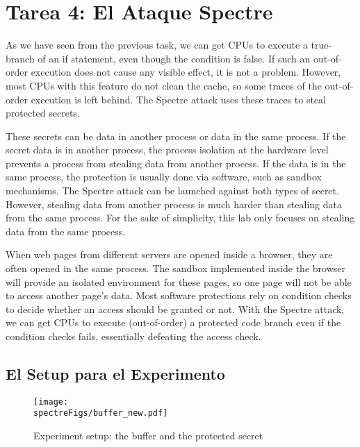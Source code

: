 \section{Tarea 4: El Ataque Spectre}


As we have seen from the previous task, we can get CPUs to execute a true-branch of an
if statement, even though the condition is false. If such an out-of-order execution does not
cause any visible effect, it is not a problem. However, most CPUs with this feature do not
clean the cache, so some traces of the out-of-order execution is left behind. The 
Spectre attack uses these traces to steal protected secrets. 


These secrets can be data in another process or data in the same process. 
If the secret data is in another process, the process isolation at the hardware level prevents 
a process from stealing data from another process. If the data is in the same process, 
the protection is usually done via software, such as sandbox mechanisms.  
The Spectre attack can be launched against both types of secret. However, 
stealing data from another process is much harder than stealing data from the same process. For
the sake of simplicity, this lab only focuses on stealing data from the same process. 

When web pages from different servers are opened inside a browser, they are often opened in the
same process. The sandbox implemented inside the browser will provide an isolated environment
for these pages, so one page will not be able to access another page's data. 
Most software protections rely on condition checks to decide whether an access should be
granted or not. With the Spectre attack, we can get CPUs to execute (out-of-order) 
a protected code branch even if the condition checks fails, essentially defeating
the access check.


\subsection{El Setup para el Experimento} 


\begin{figure}[htb]
\centering
\texttt{[image: \\spectreFigs/buffer\_new.pdf]}
\caption{Experiment setup: the buffer and the protected secret}
\label{spectre:fig:buffer}
\end{figure}

